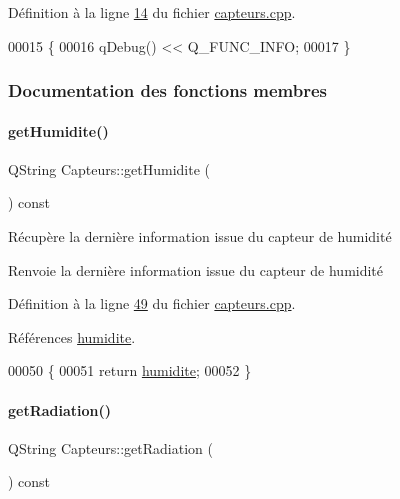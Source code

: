 Définition à la ligne \hyperlink{capteurs_8cpp_source_l00014}{14} du fichier \hyperlink{capteurs_8cpp_source}{capteurs.\+cpp}.


\begin{DoxyCode}
00015 \{
00016     qDebug() << Q\_FUNC\_INFO;
00017 \}
\end{DoxyCode}


\subsubsection{Documentation des fonctions membres}
\mbox{\label{class_capteurs_a419b69b8b2fcc02a9bb7bdff39f87b06}} 
\paragraph{\texorpdfstring{get\+Humidite()}{getHumidite()}}
{\footnotesize\ttfamily Q\+String Capteurs\+::get\+Humidite (\begin{DoxyParamCaption}{ }\end{DoxyParamCaption}) const}



Récupère la dernière information issue du capteur de humidité 

\begin{DoxyReturn}{Renvoie}
la dernière information issue du capteur de humidité 
\end{DoxyReturn}


Définition à la ligne \hyperlink{capteurs_8cpp_source_l00049}{49} du fichier \hyperlink{capteurs_8cpp_source}{capteurs.\+cpp}.



Références \hyperlink{capteurs_8h_source_l00024}{humidite}.


\begin{DoxyCode}
00050 \{
00051     \textcolor{keywordflow}{return} \hyperlink{class_capteurs_a8967c76dbc9c1f2ff8339cb8f00c3adb}{humidite};
00052 \}
\end{DoxyCode}
\mbox{\label{class_capteurs_aaee3d64c752b09f8674fa62907f38cbc}} 
\paragraph{\texorpdfstring{get\+Radiation()}{getRadiation()}}
{\footnotesize\ttfamily Q\+String Capteurs\+::get\+Radiation (\begin{DoxyParamCaption}{ }\end{DoxyParamCaption}) const}



